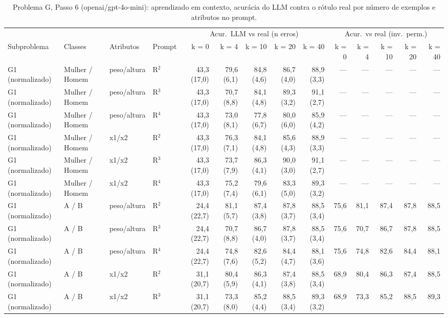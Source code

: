 \begin{table}[htbp]
\centering
\footnotesize
\caption{Problema G, Passo 6 (openai/gpt-4o-mini): aprendizado em contexto, acurácia do LLM contra o rótulo real por número de exemplos e atributos no prompt.}
\label{tab:bloco3_G_passo6_k_gpt4mini}
\begin{tabular}{llllrrrrrrrrrr}
\toprule
 &  &  &  & \multicolumn{5}{c}{Acur.\ LLM vs real (n erros)} & \multicolumn{5}{c}{Acur.\ vs real (inv.\ perm.)} \\ \cmidrule(lr){5-9} \cmidrule(lr){10-14}
Subproblema & Classes & Atributos & Prompt & k = 0 & k = 4 & k = 10 & k = 20 & k = 40 & k = 0 & k = 4 & k = 10 & k = 20 & k = 40 \\
\midrule
G1 (normalizado) & Mulher / Homem & peso/altura & R$^2$ & 43,3 (17,0) & 79,6 (6,1) & 84,8 (4,6) & 86,7 (4,0) & 88,9 (3,3) & — & — & — & — & — \\
G1 (normalizado) & Mulher / Homem & peso/altura & R$^3$ & 43,3 (17,0) & 70,7 (8,8) & 84,1 (4,8) & 89,3 (3,2) & 91,1 (2,7) & — & — & — & — & — \\
G1 (normalizado) & Mulher / Homem & peso/altura & R$^4$ & 43,3 (17,0) & 73,0 (8,1) & 77,8 (6,7) & 80,0 (6,0) & 85,9 (4,2) & — & — & — & — & — \\
G1 (normalizado) & Mulher / Homem & x1/x2 & R$^2$ & 43,3 (17,0) & 76,3 (7,1) & 84,1 (4,8) & 85,6 (4,3) & 88,9 (3,3) & — & — & — & — & — \\
G1 (normalizado) & Mulher / Homem & x1/x2 & R$^3$ & 43,3 (17,0) & 73,7 (7,9) & 86,3 (4,1) & 90,0 (3,0) & 91,1 (2,7) & — & — & — & — & — \\
G1 (normalizado) & Mulher / Homem & x1/x2 & R$^4$ & 43,3 (17,0) & 75,2 (7,4) & 79,6 (6,1) & 83,3 (5,0) & 89,3 (3,2) & — & — & — & — & — \\
G1 (normalizado) & A / B & peso/altura & R$^2$ & 24,4 (22,7) & 81,1 (5,7) & 87,4 (3,8) & 87,8 (3,7) & 88,5 (3,4) & 75,6 & 81,1 & 87,4 & 87,8 & 88,5 \\
G1 (normalizado) & A / B & peso/altura & R$^3$ & 24,4 (22,7) & 70,7 (8,8) & 86,7 (4,0) & 87,8 (3,7) & 88,5 (3,4) & 75,6 & 70,7 & 86,7 & 87,8 & 88,5 \\
G1 (normalizado) & A / B & peso/altura & R$^4$ & 24,4 (22,7) & 74,8 (7,6) & 82,6 (5,2) & 84,4 (4,7) & 88,1 (3,6) & 75,6 & 74,8 & 82,6 & 84,4 & 88,1 \\
G1 (normalizado) & A / B & x1/x2 & R$^2$ & 31,1 (20,7) & 80,4 (5,9) & 86,3 (4,1) & 87,4 (3,8) & 88,5 (3,4) & 68,9 & 80,4 & 86,3 & 87,4 & 88,5 \\
G1 (normalizado) & A / B & x1/x2 & R$^3$ & 31,1 (20,7) & 73,3 (8,0) & 85,2 (4,4) & 88,5 (3,4) & 89,3 (3,2) & 68,9 & 73,3 & 85,2 & 88,5 & 89,3 \\

\end{tabular}
\end{table}
